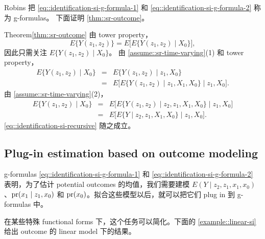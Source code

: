 Robins 把 \cref{eq::identification-si-g-formula-1} 和 \cref{eq::identification-si-g-formula-2} 称为 g-formulas。
下面证明 \cref{thm::sr-outcome}。
 

\begin{myproof}{Theorem}{\cref{thm::sr-outcome}}
由 tower property，
$$
E\{ Y(z_1, z_2) \}  = E \Big[  E\{ Y(z_1, z_2) \mid X_0 \}  \Big ],
$$
因此只需关注 $E\{ Y(z_1, z_2) \mid X_0 \}$。
由 \cref{assume::sr-time-varying}(1) 和 tower property，
\begin{eqnarray*}
E\{ Y(z_1, z_2) \mid X_0 \} &=& E\{ Y(z_1, z_2) \mid  z_1, X_0 \} \\
&=& E\Big [ E\{ Y(z_1, z_2) \mid   z_1, X_1, X_0 \} \mid   z_1, X_0  \Big].
\end{eqnarray*}
由 \cref{assume::sr-time-varying}(2)，
\begin{eqnarray*}
E\{ Y(z_1, z_2) \mid X_0 \}  
&=& E\Big [ E\{ Y(z_1, z_2) \mid z_2,   z_1,X_1, X_0 \} \mid  z_1, X_0  \Big] \\
&=& E\Big [ E\{ Y \mid z_2, z_1, X_1, X_0 \} \mid   z_1, X_0  \Big] .
\end{eqnarray*}
\cref{eq::identification-si-recursive} 随之成立。
\end{myproof}



\subsection{Plug-in estimation based on outcome modeling}
\label{section::si-plug-in-outcome}

g-formulas \cref{eq::identification-si-g-formula-1} 和 \cref{eq::identification-si-g-formula-2} 表明，为了估计 potential outcomes 的均值，我们需要建模 $E(Y\mid z_2,z_1, x_1, x_0)$、$\textup{pr}(x_1\mid z_1,x_0)$ 和 $\textup{pr}(x_0)$。拟合这些模型以后，就可以把它们 plug in 到 g-formulas 中。

在某些特殊 functional forms 下，这个任务可以简化。下面的 \cref{example::linear-si} 给出 outcome 的 linear model 下的结果。

